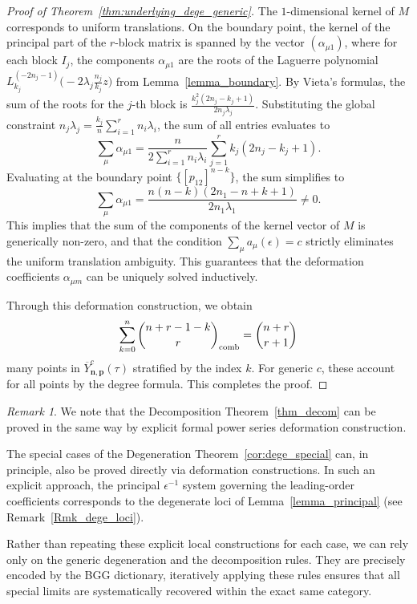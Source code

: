 \documentclass[11pt]{amsart}
\theoremstyle{remark}
\newtheorem{remark}[theorem]{Remark}
\numberwithin{equation}{section}
\begin{document}
\begin{proof}[Proof of Theorem~\ref{thm:underlying_dege_generic}]
The $1$-dimensional kernel of $M$ corresponds to uniform translations. On the boundary point, the kernel of the principal part of the $r$-block matrix is spanned by the vector $(\alpha_{\mu 1})$, where for each block $I_j$, the components $\alpha_{\mu 1}$ are the roots of the Laguerre polynomial $L_{k_j}^{(-2n_j-1)}\big(-2\lambda_j \frac{n_j}{k_j} z\big)$ from Lemma~\ref{lemma_boundary}. By Vieta's formulas, the sum of the roots for the $j$-th block is $\frac{k_j^2(2n_j - k_j + 1)}{2n_j\lambda_j}$. Substituting the global constraint $n_j \lambda_j = \frac{k_j}{n} \sum_{i=1}^r n_i \lambda_i$, the sum of all entries evaluates to
\[
    \sum_{\mu} \alpha_{\mu 1} = \frac{n}{2 \sum_{i=1}^r n_i \lambda_i} \sum_{j=1}^r k_j(2n_j - k_j + 1).
\]
Evaluating at the boundary point $\{[p_{12}]^{n-k}\}$, the sum simplifies to
\[
    \sum_{\mu} \alpha_{\mu 1} = \frac{n(n-k)(2n_1 - n + k + 1)}{2n_1\lambda_1} \neq 0.
\]
This implies that the sum of the components of the kernel vector of $M$ is generically non-zero, and that the condition $\sum_\mu a_\mu(\epsilon) = c$ strictly eliminates the uniform translation ambiguity. This guarantees that the deformation coefficients $\alpha_{\mu m}$ can be uniquely solved inductively.

Through this deformation construction, we obtain
\[
    \sum_{k=0}^{n} \binom{n+r-1-k}{r}_{\rm comb} = \binom{n+r}{r+1}
\]
many points in $\overline{Y}_{\mathbf{n},\mathbf{p}}^c(\tau)$ stratified by the index $k$. For generic $c$, these account for all points by the degree formula. This completes the proof.
\end{proof}

\begin{remark}
We note that the Decomposition Theorem~\ref{thm_decom} can be proved in the same way by explicit formal power series deformation construction. 

The special cases of the Degeneration Theorem~\ref{cor:dege_special} can, in principle, also be proved directly via deformation constructions. In such an explicit approach, the principal $\epsilon^{-1}$ system governing the leading-order coefficients corresponds to the degenerate loci of Lemma~\ref{lemma_principal} (see Remark~\ref{Rmk_dege_loci}). 

Rather than repeating these explicit local constructions for each case, we can rely only on the generic degeneration and the decomposition rules. They are precisely encoded by the BGG dictionary, iteratively applying these rules ensures that all special limits are systematically recovered within the exact same category.
\end{remark}
\end{document}
